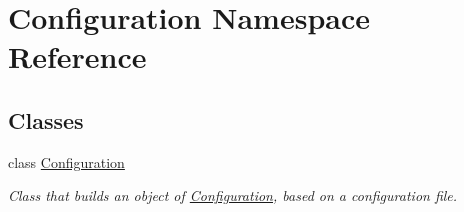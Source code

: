 \hypertarget{namespace_configuration}{}\section{Configuration Namespace Reference}
\label{namespace_configuration}
\subsection*{Classes}
\begin{DoxyCompactItemize}
\item 
class \hyperlink{class_configuration_1_1_configuration}{Configuration}
\begin{DoxyCompactList}\small\item\em Class that builds an object of \hyperlink{class_configuration_1_1_configuration}{Configuration}, based on a configuration file. \end{DoxyCompactList}\end{DoxyCompactItemize}
